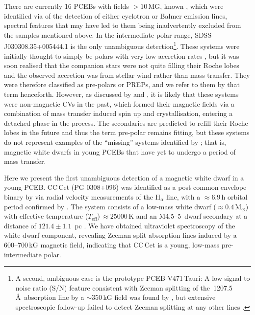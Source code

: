 \documentclass[fleqn,usenatbib]{mnras}
\newcommand{\Msun}{\mbox{$\mathrm{M}_{\odot}$}}
\newcommand{\Teff}{\mbox{$T_{\mathrm{eff}}$}}
\begin{document}
There are currently 16 PCEBs with fields $ > 10$\,MG, known \citep{reimersetal99-1, reimers+hagen00-1, schmidtetal05-1, schmidtetal07-1, schwopeetal09-1, parsonsetal21-1}, which were identified via of the detection of either cyclotron or Balmer emission lines, spectral features that may have led to them being inadvertently excluded from the samples mentioned above. In the intermediate polar range, SDSS\,J030308.35+005444.1 \citep[$B = 8$\,MG,][]{parsonsetal13-1} is the only unambiguous detection\footnote{A second, ambiguous case is the prototype PCEB V471\,Tauri: A low signal to noise ratio (S/N) feature consistent with Zeeman splitting of the \,1207.5\,\AA\ absorption line by a $\sim 350$\,kG field was found by \citet{sionetal98-2}, but extensive spectroscopic follow-up failed to detect Zeeman splitting at any other lines \citep{sionetal12-1}.}. These systems were initially thought to simply be polars with very low accretion rates \citep[``LARPs'', e.g. ][]{reimersetal99-1}, but it was soon realised that the companion stars were not quite filling their Roche lobes \citep[e.g. ][]{vogeletal07-1} and the observed accretion was from stellar wind rather than mass transfer. They were therefore classified as pre-polars or PREPs, and we refer to them by that term henceforth. However, as discussed by \citet{parsonsetal21-1} and \citet{schreiberetal21-1},  it is likely that these systems were non-magnetic CVs in the past, which formed their magnetic fields via a combination of mass transfer induced spin up and crystallisation, entering a detached phase in the process. The secondaries are predicted to refill their Roche lobes in the future and thus the term pre-polar remains fitting, but these systems do not represent examples of the ``missing'' systems identified by \citet{liebertetal05-2}; that is, magnetic white dwarfs in young PCEBs that have yet to undergo a period of mass transfer.         

Here we present the first unambiguous detection of a magnetic white dwarf in a young PCEB. CC\,Cet (PG 0308+096) was identified as a post common envelope binary by \citet{safferetal93-1} via radial velocity measurements of the H$_{\alpha}$ line, with a $\approx 6.9$\,h orbital period confirmed by \citet{somersetal96-2}. The system consists of a low-mass white dwarf ($\approx 0.4$\,\Msun) with effective temperature (\Teff)\,$\approx 25000$\,K and an M4.5--5\, dwarf secondary \citep{tappertetal07-2} at a distance of $121.4\pm 1.1$~pc \citep{gaia18-1}. We have obtained ultraviolet spectroscopy of the white dwarf component, revealing Zeeman-split absorption lines induced by a 600--700\,kG magnetic field, indicating that CC\,Cet is a young, low-mass pre-intermediate polar. 
\end{document}
